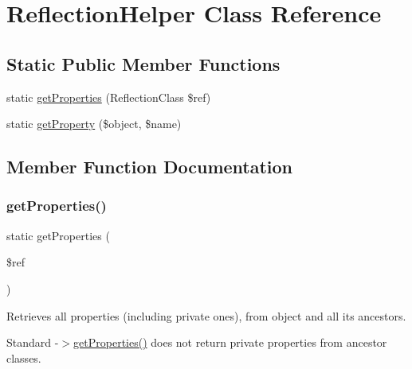 \hypertarget{class_deep_copy_1_1_reflection_1_1_reflection_helper}{}\section{Reflection\+Helper Class Reference}
\label{class_deep_copy_1_1_reflection_1_1_reflection_helper}
\subsection*{Static Public Member Functions}
\begin{DoxyCompactItemize}
\item 
static \mbox{\hyperlink{class_deep_copy_1_1_reflection_1_1_reflection_helper_a7bcfead6b23a2737622241564072d657}{get\+Properties}} (Reflection\+Class \$ref)
\item 
static \mbox{\hyperlink{class_deep_copy_1_1_reflection_1_1_reflection_helper_a2cbe7dd2f6c9bc8b41ca4beaffb376a7}{get\+Property}} (\$object, \$name)
\end{DoxyCompactItemize}


\subsection{Member Function Documentation}
\mbox{\label{class_deep_copy_1_1_reflection_1_1_reflection_helper_a7bcfead6b23a2737622241564072d657}} 
\subsubsection{\texorpdfstring{get\+Properties()}{getProperties()}}
{\footnotesize\ttfamily static get\+Properties (\begin{DoxyParamCaption}\item[{Reflection\+Class}]{\$ref }\end{DoxyParamCaption})\hspace{0.3cm}{\ttfamily [static]}}

Retrieves all properties (including private ones), from object and all its ancestors.

Standard -\/$>$\mbox{\hyperlink{class_deep_copy_1_1_reflection_1_1_reflection_helper_a7bcfead6b23a2737622241564072d657}{get\+Properties()}} does not return private properties from ancestor classes.

